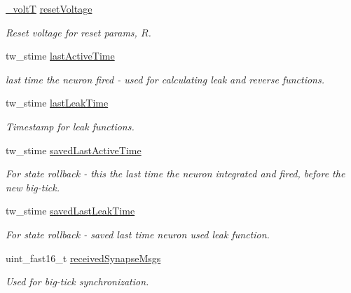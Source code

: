 \begin{DoxyCompactItemize}
\hyperlink{assist_8h_abe1fc1b8f9efd1187e564bcb8de7f815}{\+\_\+volt\+T} \hyperlink{structneuron_state_af69a2c108fe9e7154fa047ea5acc5d80}{reset\+Voltage}
\begin{DoxyCompactList}\small\item\em Reset voltage for reset params, $R$. \end{DoxyCompactList}\item 
tw\+\_\+stime \hyperlink{structneuron_state_a0658ad1f8b57a00589c6ea84f9a4ab13}{last\+Active\+Time}
\begin{DoxyCompactList}\small\item\em last time the neuron fired -\/ used for calculating leak and reverse functions. \end{DoxyCompactList}\item 
tw\+\_\+stime \hyperlink{structneuron_state_a6f4e4d8fc1cf0257b486e01f628d2656}{last\+Leak\+Time}
\begin{DoxyCompactList}\small\item\em Timestamp for leak functions. \end{DoxyCompactList}\item 
tw\+\_\+stime \hyperlink{structneuron_state_a6922b3f3041346eb83cfc6352a22277b}{saved\+Last\+Active\+Time}
\begin{DoxyCompactList}\small\item\em For state rollback -\/ this the last time the neuron integrated and fired, before the new big-\/tick. \end{DoxyCompactList}\item 
tw\+\_\+stime \hyperlink{structneuron_state_a50734a9ba605a083a90814b63d039a03}{saved\+Last\+Leak\+Time}
\begin{DoxyCompactList}\small\item\em For state rollback -\/ saved last time neuron used leak function. \end{DoxyCompactList}\item 
uint\+\_\+fast16\+\_\+t \hyperlink{structneuron_state_af8935bcba177f2f3dfb9119c39ef7dc5}{received\+Synapse\+Msgs}
\begin{DoxyCompactList}\small\item\em Used for big-\/tick synchronization. \end{DoxyCompactList}\end{DoxyCompactItemize}

